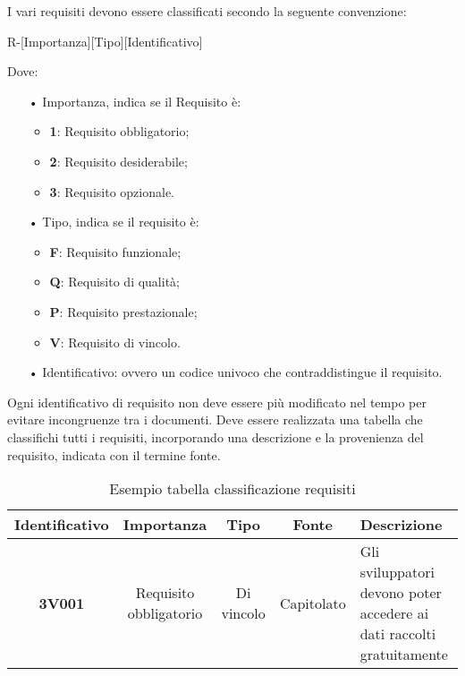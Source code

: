 I vari requisiti devono essere classificati secondo la seguente {convenzione}:
\begin{center}
R-[Importanza][Tipo][Identificativo]
\end{center}
Dove:
\begin{itemize}
\item[•] Importanza, indica se il Requisito è:
\begin{itemize}
\item \textbf{1}: Requisito obbligatorio;
\item \textbf{2}: Requisito desiderabile;
\item \textbf{3}: Requisito opzionale.
\end{itemize}
\item[•] Tipo, indica se il requisito è:
\begin{itemize}
\item \textbf{F}: Requisito funzionale;
\item \textbf{Q}: Requisito di qualità;
\item \textbf{P}: Requisito prestazionale;
\item \textbf{V}: Requisito di vincolo.
\end{itemize}
\item[•] Identificativo: ovvero un codice univoco che contraddistingue il requisito.
\end{itemize}
Ogni identificativo di requisito non deve essere più modificato nel tempo per evitare incongruenze tra i documenti.
Deve essere realizzata una tabella che classifichi tutti i requisiti, incorporando una descrizione e la provenienza del requisito, indicata con il termine fonte.
\begin{table}[H]
\centering
\begin{tabularx}{\linewidth}{| c | c | c | c | Z |}
\hline
\textbf{Identificativo} & \textbf{Importanza} & \textbf{Tipo} & \textbf{Fonte} & \textbf{Descrizione} \\
\hline
\textbf{3V001} & Requisito obbligatorio & Di vincolo & Capitolato & Gli sviluppatori devono poter accedere ai dati raccolti gratuitamente \\
\hline
\end{tabularx}
\caption{Esempio tabella classificazione requisiti}
\end{table}
